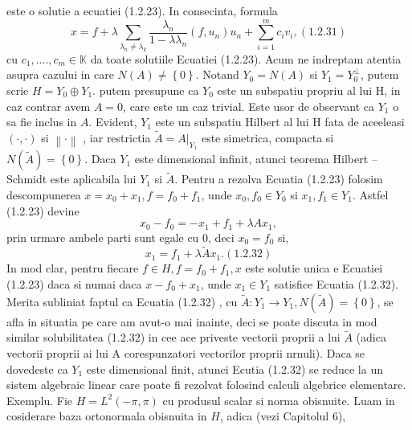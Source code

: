 \documentclass[a4paper,12pt,oneside]{report}
\begin{document}
	este o solutie a ecuatiei (1.2.23). In consecinta, formula
	\begin{displaymath}
		x = f+ \lambda \sum_{\lambda_{n}\neq \lambda_{k}}\frac{\lambda_{n}}{1 - \lambda \lambda _{n}}\left ( f, u_{n} \right )u_{n} + \sum_{i=1}^{m}c_{i}v_{i},(1.2.31)
	\end{displaymath}
	cu \(c_{1},....,c_{m} \in\mathbb{K}\) da toate solutiile Ecuatiei (1.2.23). 
	Acum ne indreptam atentia asupra cazului in care \(N\left ( A \right ) \neq \left \{  0\right \}\). Notand \(Y_{0} = N\left ( A \right )\) si \(Y_{1} = Y_{0}^{\perp }\), putem scrie \(H = Y_{0}\oplus Y_{1}\). putem presupune ca \(Y_{0}\) este un subspatiu propriu al lui H, in caz contrar avem \(A = 0\), care este un caz trivial. Este usor de observant ca \(Y_{1}\)  o sa fie inclus in \(A\). Evident, \(Y_{1}\) este un subspatiu Hilbert al lui H fata de aceeleasi \(\left ( \cdot ,\cdot  \right )\) si \(\left \| \cdot  \right \|\) , iar restrictia \(\tilde{A} = A|_{Y_{1}}\) este simetrica, compacta si \(N\left ( \tilde{A} \right ) = \left \{ 0 \right \}\). Daca \(Y_{1}\)  este dimensional infinit, atunci teorema Hilbert – Schmidt este aplicabila lui \(Y_{1}\) si \(\tilde{A}\). Pentru a rezolva Ecuatia (1.2.23) folosim descompunerea \(x = x_{0}+x_{1}, f = f_{0} + f_{1}\), unde \(x_{0},f_{0} \in Y_{0}\) si \(x_{1},f_{1} \in Y_{1}\). Astfel (1.2.23) devine 
	\begin{displaymath}
		x_{0} - f_{0} = -x_{1} + f_{1} + \lambda Ax_{1}, 
	\end{displaymath}
	prin urmare ambele parti sunt egale cu \(0\), deci \(x_{0} = f_{0}\) si, 
	\begin{displaymath}
		x_{1} = f_{1} + \lambda \tilde{A}x_{1}. (1.2.32)
	\end{displaymath}
	In mod clar, pentru fiecare \(f\in H, f = f_{0} + f_{1}, x\) este solutie unica e Ecuatiei (1.2.23) daca si numai daca \(x - f_{0} + x_{1}\), unde \(x_{1} \in Y_{1}\) satisfice Ecuatia (1.2.32).  Merita subliniat faptul ca Ecuatia (1.2.32) , cu \(\tilde{A} : Y_{1}\rightarrow Y_{1}, N\left ( \tilde{A} \right ) = \left \{ 0 \right \}\), se afla in situatia pe care am avut-o mai inainte, deci se poate discuta in mod similar solubilitatea (1.2.32) in cee ace priveste vectorii proprii a lui \(\tilde{A}\) (adica vectorii proprii ai lui A corespunzatori vectorilor proprii nrnuli). Daca se dovedeste ca \(Y_{1}\) este dimensional finit, atunci Ecutia (1.2.32) se reduce la un sistem algebraic linear care poate fi rezolvat folosind calculi algebrice elementare. 
	Exemplu. Fie \(H = L^{2}\left ( -\pi ,\pi  \right )\) cu produsul scalar si norma obisnuite. Luam in cosiderare baza ortonormala obisnuita in \(H\), adica (vezi Capitolul 6), 
\end{document}
